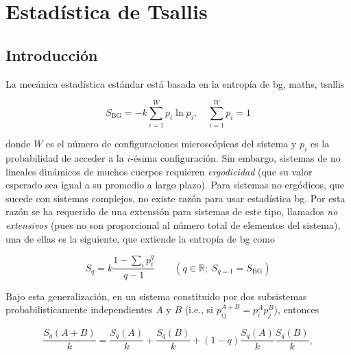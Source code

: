 \chapter{Estadística de Tsallis}\label{ch-Tsallis}


\section{Introducción}

La mecánica estadística estándar está basada en la entropía de \acrfull{bg}, \Gls{maths}, \Gls{tsallis}

\begin{equation}
{S}_{\mathrm{BG}} = - k \sum_{i=1}^{W} {p}_{i} \ln {p}_{i}, \quad \sum_{i=1}^{W} {p}_{i} = 1
\end{equation}

donde $W$ es el número de configuraciones microscópicas del sistema y ${p}_{i}$ es la probabilidad de acceder a la $i$-ésima configuración. Sin embargo, sistemas de no lineales dinámicos de muchos cuerpos requieren \emph{ergodicidad} (que su valor esperado sea igual a su promedio a largo plazo). Para sistemas no ergódicos, que sucede con sistemas complejos, no existe razón para usar estadística \acrshort{bg}. Por esta razón se ha requerido de una extensión para sistemas de este tipo, llamados \emph{no extensivos} (pues no son proporcional al número total de elementos del sistema), una de ellas es la siguiente, que extiende la entropía de \acrshort{bg} como

\begin{equation}
{S}_{q} = k \frac{1-\sum_{i} {p}_{i}^{q}}{q-1} \qquad (q\in \mathbb{R};\; {S}_{q=1} = {S}_{\mathrm{BG}})
\end{equation}

Bajo esta generalización, en un sistema constituido por dos subsistemas probabilisticamente independientes $A$ y $B$ (i.e., si ${p}_{ij}^{A+B} = {p}_{i}^{A}{p}_{j}^{B}$), entonces

\begin{equation}\label{eq-TsallisTwoSystems}
\frac{{S}_{q}(A+B)}{k} = \frac{{S}_{q}(A)}{k} + \frac{{S}_{q}(B)}{k} + (1 - q) \frac{{S}_{q}(A)}{k}\frac{{S}_{q}(B)}{k},
\end{equation}

